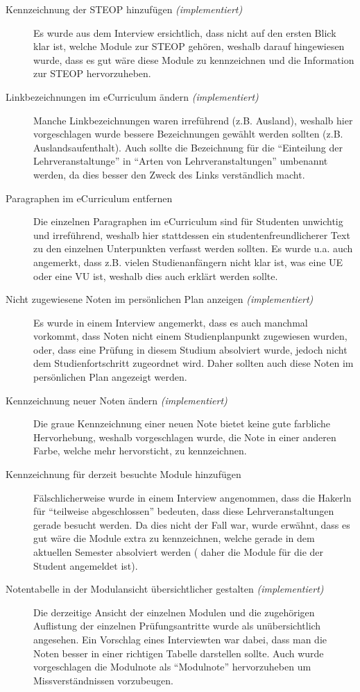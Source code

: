 \documentclass[a4paper,10pt]{scrartcl}
\begin{document}
\begin{description}
 \item[Kennzeichnung der STEOP hinzufügen \textit{(implementiert)}] Es wurde aus dem Interview ersichtlich, dass nicht auf den ersten Blick klar ist, welche Module zur STEOP gehören, weshalb darauf hingewiesen wurde, dass es gut wäre diese Module
 zu kennzeichnen und die Information zur STEOP hervorzuheben.
 \item[Linkbezeichnungen im eCurriculum ändern \textit{(implementiert)}] Manche Linkbezeichnungen waren irreführend (z.B. Ausland), weshalb hier vorgeschlagen wurde bessere Bezeichnungen gewählt werden sollten (z.B. Auslandsaufenthalt).
 Auch sollte die Bezeichnung für
die ``Einteilung der Lehrveranstaltunge'' in ``Arten von Lehrveranstaltungen'' umbenannt werden, da dies besser den Zweck des Links verständlich macht.
 \item[Paragraphen im eCurriculum entfernen] Die einzelnen Paragraphen im eCurriculum sind für Studenten unwichtig und irreführend, weshalb hier stattdessen ein studentenfreundlicherer
 Text zu den einzelnen Unterpunkten verfasst werden sollten. Es wurde u.a. auch angemerkt, dass z.B. vielen Studienanfängern nicht klar ist, was eine UE oder eine VU ist, weshalb dies auch erklärt werden sollte.
 \item[Nicht zugewiesene Noten im persönlichen Plan anzeigen \textit{(implementiert)}] Es wurde in einem Interview angemerkt, dass es auch manchmal vorkommt, dass Noten nicht einem Studienplanpunkt zugewiesen wurden, oder, dass eine Prüfung in diesem
Studium absolviert wurde, jedoch nicht dem Studienfortschritt zugeordnet wird. Daher sollten auch diese Noten im persönlichen Plan angezeigt werden.
 \item[Kennzeichnung neuer Noten ändern \textit{(implementiert)}] Die graue Kennzeichnung einer neuen Note bietet keine gute farbliche Hervorhebung, weshalb vorgeschlagen wurde, die Note in einer anderen Farbe, welche mehr hervorsticht, zu kennzeichnen.
 \item[Kennzeichnung für derzeit besuchte Module hinzufügen] Fälschlicherweise wurde in einem Interview angenommen, dass die Hakerln für ``teilweise abgeschlossen'' bedeuten, dass diese
 Lehrveranstaltungen gerade besucht werden. Da dies nicht der Fall war, wurde erwähnt, dass es gut wäre die Module extra zu kennzeichnen, welche gerade in dem aktuellen Semester absolviert werden (
 daher die Module für die der Student angemeldet ist).
 \item[Notentabelle in der Modulansicht übersichtlicher gestalten \textit{(implementiert)}] Die derzeitige Ansicht der einzelnen Modulen und die zugehörigen Auflistung der einzelnen Prüfungsantritte wurde als unübersichtlich angesehen. Ein Vorschlag eines
 Interviewten war dabei, dass man die Noten besser in einer richtigen Tabelle darstellen sollte. Auch wurde vorgeschlagen die Modulnote als ``Modulnote'' hervorzuheben um Missverständnissen vorzubeugen.
 
 
\end{description}
\end{document}

